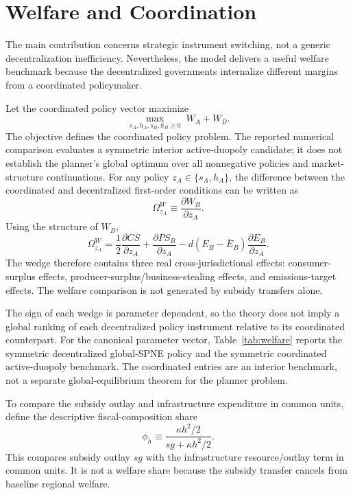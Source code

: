 \section{Welfare and Coordination}
\label{sec:welfare}

The main contribution concerns strategic instrument switching, not a generic decentralization inefficiency. Nevertheless, the model delivers a useful welfare benchmark because the decentralized governments internalize different margins from a coordinated policymaker.

Let the coordinated policy vector maximize
\begin{equation}
\max_{s_A,h_A,s_B,h_B\geq0}\;W_A+W_B.
\label{eq:planner}
\end{equation}
The objective defines the coordinated policy problem. The reported numerical comparison evaluates a symmetric interior active-duopoly candidate; it does not establish the planner's global optimum over all nonnegative policies and market-structure continuations. For any policy $z_A\in\{s_A,h_A\}$, the difference between the coordinated and decentralized first-order conditions can be written as
\begin{equation}
\Omega_{z_A}^{W}
\equiv
\frac{\partial W_B}{\partial z_A}.
\label{eq:welfare-wedge-def}
\end{equation}
Using the structure of $W_B$,
\begin{equation}
\Omega_{z_A}^{W}
=
\frac12\frac{\partial CS}{\partial z_A}
+
\frac{\partial PS_B}{\partial z_A}
-
d(E_B-\bar E_B)\frac{\partial E_B}{\partial z_A}.
\label{eq:welfare-wedge}
\end{equation}
The wedge therefore contains three real cross-jurisdictional effects: consumer-surplus effects, producer-surplus/business-stealing effects, and emissions-target effects. The welfare comparison is not generated by subsidy transfers alone.

The sign of each wedge is parameter dependent, so the theory does not imply a global ranking of each decentralized policy instrument relative to its coordinated counterpart. For the canonical parameter vector, Table~\ref{tab:welfare} reports the symmetric decentralized global-SPNE policy and the symmetric coordinated active-duopoly benchmark. The coordinated entries are an interior benchmark, not a separate global-equilibrium theorem for the planner problem.

To compare the subsidy outlay and infrastructure expenditure in common units, define the descriptive fiscal-composition share
\begin{equation}
\phi_h
\equiv
\frac{\kappa h^2/2}{s g+\kappa h^2/2}.
\label{eq:fiscal-infra-share}
\end{equation}
This compares subsidy outlay $sg$ with the infrastructure resource/outlay term in common units. It is not a welfare share because the subsidy transfer cancels from baseline regional welfare.

